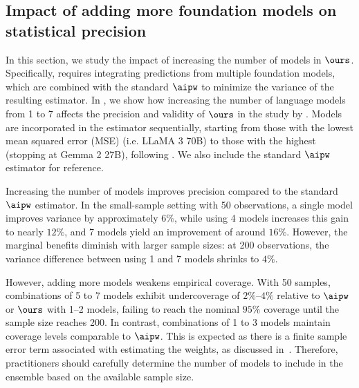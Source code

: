 \subsection{Impact of adding more foundation models on statistical precision}
\label{apx:adding_models}
In this section, we study the impact of increasing the number of models in $\ours$. Specifically,  requires integrating predictions from multiple foundation models, which are combined with the standard $\aipw$ to minimize the variance of the resulting estimator. In , we show how increasing the number of language models from 1 to 7 affects the precision and validity of $\ours$ in the study by \citet{fahey2023principled}. Models are incorporated in the estimator sequentially, starting from those with the lowest mean squared error (MSE) (i.e. LLaMA 3 70B) to those with the highest (stopping at Gemma 2 27B), following . We also include the standard $\aipw$ estimator for reference.



Increasing the number of models improves precision compared to the standard $\aipw$ estimator. In the small-sample setting with 50 observations, a single model improves variance by approximately $6\%$, while using 4 models increases this gain to nearly $12\%$, and 7 models yield an improvement of around $16\%$. However, the marginal benefits diminish with larger sample sizes: at 200 observations, the variance difference between using 1 and 7 models shrinks to $4\%$.

However, adding more models weakens empirical coverage. With 50 samples, combinations of 5 to 7 models exhibit undercoverage of $2\%$–$4\%$ relative to $\aipw$ or $\ours$ with 1–2 models, failing to reach the nominal $95\%$ coverage until the sample size reaches 200. In contrast, combinations of 1 to 3 models maintain coverage levels comparable to $\aipw$. This is expected as there is a finite sample error term associated with estimating the weights, as discussed in~. Therefore, practitioners should carefully determine the number of models to include in the ensemble based on the available sample size.













